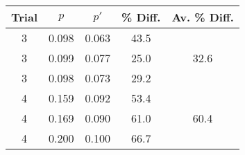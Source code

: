 \begin{tabular}{ | c | c c | c | c | } \hline
    Trial & $p$ & $p'$ & \% Diff. & Av. \% Diff. \\ \hline
    3 & 0.098 & 0.063 & 43.5 & \multirow{3}{*}{32.6} \\
    3 & 0.099 & 0.077 & 25.0 & \\
    3 & 0.098 & 0.073 & 29.2 & \\ \hline
    4 & 0.159 & 0.092 & 53.4 & \multirow{3}{*}{60.4} \\
    4 & 0.169 & 0.090 & 61.0 & \\
    4 & 0.200 & 0.100 & 66.7 & \\ \hline
\end{tabular}
